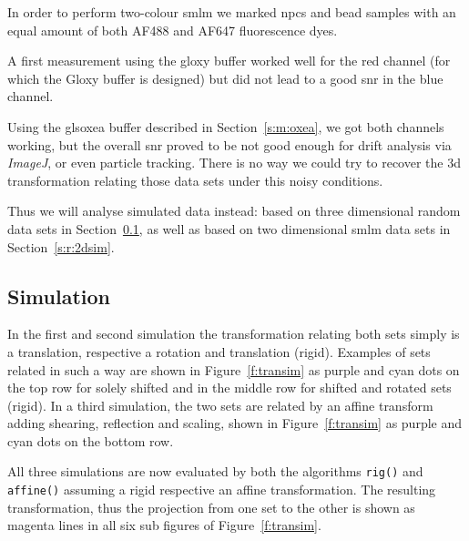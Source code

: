 \documentclass[11pt, a4paper, oneside, twocolumn]{report}
\renewcommand{\tt}{\texttt}
\newcommand{\e}{\emph}
\newcommand{\x}[1]{#1\index{#1}}
\begin{document}
In order to perform two-colour \gls{smlm} we marked \gls{npc}s and
bead samples with an equal amount of both AF488 and AF647 fluorescence
dyes.

A first measurement using the \gls{gloxy} buffer worked well for the
red channel (for which the Gloxy buffer is designed) but did not lead
to a good \gls{snr} in the blue channel.

Using the gls{oxea} buffer described in Section~\ref{s:m:oxea}, we got
both channels working, but the overall \gls{snr} proved to be not good
enough for drift analysis via \e{ImageJ}, or even \x{particle
  tracking}. There is no way we could try to recover the 3d
transformation relating those data sets under this noisy conditions.

Thus we will analyse simulated data instead: based on three
dimensional random data sets in Section~\ref{s:r:3dsim}, as well as
based on two dimensional \gls{smlm} data sets in
Section~\ref{s:r:2dsim}.


\subsection{Simulation}\label{s:r:3dsim}

In the first and second simulation the transformation relating both
sets simply is a translation, respective a rotation and translation
(rigid). Examples of sets related in such a way are shown in
Figure~\ref{f:transim} as purple and cyan dots on the top row for
solely shifted and in the middle row for shifted and rotated sets
(rigid). In a third simulation, the two sets are related by an affine
transform adding shearing, reflection and scaling, shown in
Figure~\ref{f:transim} as purple and cyan dots on the bottom row.

All three simulations are now evaluated by both the algorithms
\tt{rig()} and \tt{affine()} assuming a rigid respective an affine
transformation. The resulting transformation, thus the projection from
one set to the other is shown as magenta lines in all six sub figures
of Figure~\ref{f:transim}.
\end{document}
